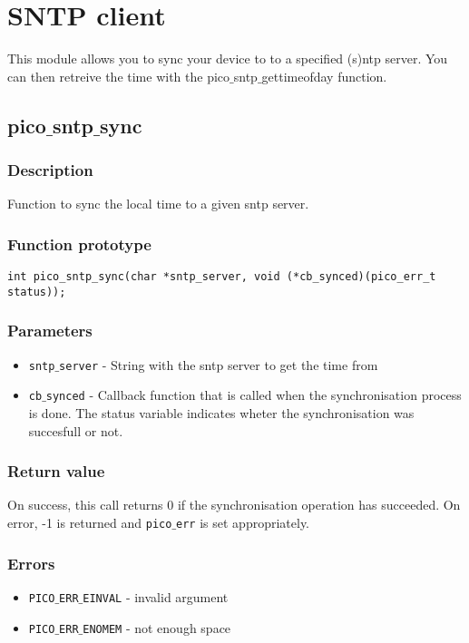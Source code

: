 \section{SNTP client}

This module allows you to sync your device to to a specified (s)ntp server.
You can then retreive the time with the pico$\_$sntp$\_$gettimeofday function.


\subsection{pico$\_$sntp$\_$sync}

\subsubsection*{Description}
Function to sync the local time to a given sntp server.
\subsubsection*{Function prototype}
\begin{verbatim}
int pico_sntp_sync(char *sntp_server, void (*cb_synced)(pico_err_t status));
\end{verbatim}

\subsubsection*{Parameters}
\begin{itemize}[noitemsep]
\item \texttt{sntp$\_$server} - String with the sntp server to get the time from
\item \texttt{cb$\_$synced} - Callback function that is called when the synchronisation process is done. The status variable indicates wheter the synchronisation was succesfull or not.
\end{itemize}

\subsubsection*{Return value}
On success, this call returns 0 if the synchronisation operation has succeeded.
On error, -1 is returned and \texttt{pico$\_$err} is set appropriately.

\subsubsection*{Errors}
\begin{itemize}[noitemsep]
\item \texttt{PICO$\_$ERR$\_$EINVAL} - invalid argument
\item \texttt{PICO$\_$ERR$\_$ENOMEM} - not enough space
\end{itemize}

